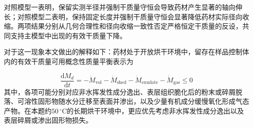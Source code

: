 \documentclass[withoutpreface,bwprint]{cumcmthesis}
\begin{document}

对照模型一表明，保留实测半径并强制干质量守恒会导致药材产生显著的轴向伸长；对照模型二表明，保持固定长度并强制干质量守恒会显著降低药材实际径向收缩。两项结果分别从几何合理性和径向收缩一致性否定严格恒定干质量的反设，共同支持主模型中出现的有效干质量下降。

对于这一现象本文做出的解释如下：药材处于开放烘干环境中，留存在样品控制体内的有效干质量可用概念性质量平衡表示为

\begin{equation}
\frac{\mathrm dM_d}{\mathrm dt}
=-\dot M_{\mathrm{vol}}
-\dot M_{\mathrm{shed}}
-\dot M_{\mathrm{exudate}}
-\dot M_{\mathrm{gas}}
\le0
\label{eq:q4-effective-dry-mass-balance}
\end{equation}
其中，各项可能分别对应非水挥发性成分逸出、表层组织脆化后的粉末或碎屑脱落、可溶性固形物随水分迁移至表面并渗出，以及少量有机成分缓慢氧化形成气态产物。在本题约$50\,{}^\circ\mathrm C$的长期烘干环境中，更应优先考虑非水挥发性成分逸出以及表层碎屑或渗出固形物损失。
\end{document}
